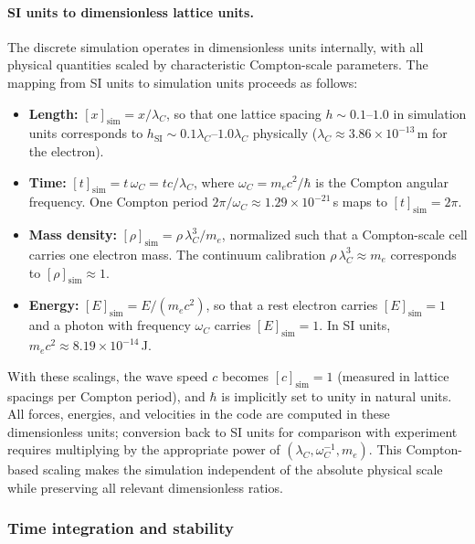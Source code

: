 \paragraph{SI units to dimensionless lattice units.}
The discrete simulation operates in dimensionless units internally, with all
physical quantities scaled by characteristic Compton-scale parameters. The
mapping from SI units to simulation units proceeds as follows:
\begin{itemize}
  \item \textbf{Length:} $[x]_{\text{sim}} = x/\lambda_C$, so that one lattice
    spacing $h \sim 0.1$--$1.0$ in simulation units corresponds to
    $h_{\text{SI}} \sim 0.1\lambda_C$--$1.0\lambda_C$ physically
    ($\lambda_C \approx 3.86 \times 10^{-13}$\,m for the electron).
  \item \textbf{Time:} $[t]_{\text{sim}} = t\,\omega_C = t c/\lambda_C$, where
    $\omega_C = m_e c^2/\hbar$ is the Compton angular frequency. One Compton
    period $2\pi/\omega_C \approx 1.29 \times 10^{-21}$\,s maps to
    $[t]_{\text{sim}} = 2\pi$.
  \item \textbf{Mass density:} $[\rho]_{\text{sim}} = \rho\,\lambda_C^3/m_e$,
    normalized such that a Compton-scale cell carries one electron mass. The
    continuum calibration $\rho\,\lambda_C^3 \approx m_e$ corresponds to
    $[\rho]_{\text{sim}} \approx 1$.
  \item \textbf{Energy:} $[E]_{\text{sim}} = E/(m_e c^2)$, so that a rest
    electron carries $[E]_{\text{sim}} = 1$ and a photon with frequency
    $\omega_C$ carries $[E]_{\text{sim}} = 1$. In SI units, $m_e c^2 \approx
    8.19 \times 10^{-14}$\,J.
\end{itemize}
With these scalings, the wave speed $c$ becomes $[c]_{\text{sim}} = 1$
(measured in lattice spacings per Compton period), and $\hbar$ is implicitly
set to unity in natural units. All forces, energies, and velocities in the code
are computed in these dimensionless units; conversion back to SI units for
comparison with experiment requires multiplying by the appropriate power of
$(\lambda_C, \omega_C^{-1}, m_e)$. This Compton-based scaling makes the
simulation independent of the absolute physical scale while preserving all
relevant dimensionless ratios.

\subsubsection{Time integration and stability}\label{time-integration-and-stability}

